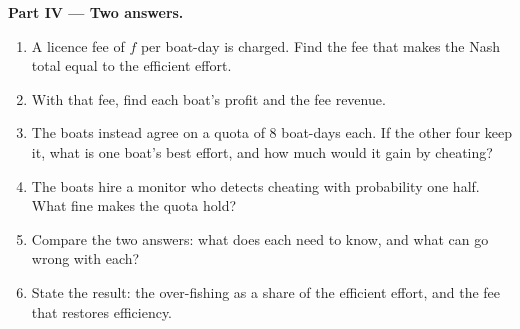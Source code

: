 \begin{problem}
\medskip
\noindent\textbf{Part IV --- Two answers.}
\begin{enumerate}[resume]
  \item A licence fee of $f$ per boat-day is charged. Find the fee that makes the Nash total equal to the efficient
        effort.
  \item With that fee, find each boat's profit and the fee revenue.
  \item The boats instead agree on a quota of 8 boat-days each. If the other four keep it, what is one boat's best
        effort, and how much would it gain by cheating?
  \item The boats hire a monitor who detects cheating with probability one half. What fine makes the quota hold?
  \item Compare the two answers: what does each need to know, and what can go wrong with each?
  \item State the result: the over-fishing as a share of the efficient effort, and the fee that restores
        efficiency.
\end{enumerate}
\end{problem}
